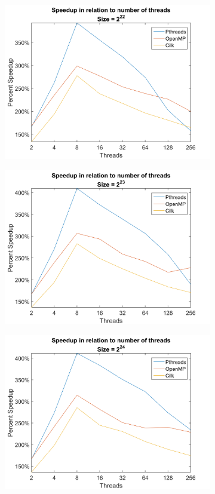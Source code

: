 \documentclass[11pt,a4paper,titlepage]{article}
\begin{document}
\begin{figure}[h!]
\begin{subfigure}[b]{0.45\textwidth}
				\includegraphics[width=\textwidth]{figures/figure-3.7.png}
				\caption{}
			\end{subfigure}
			\begin{subfigure}[b]{0.45\textwidth}
				\includegraphics[width=\textwidth]{figures/figure-3.8.png}
				\caption{}
			\end{subfigure}
			\begin{subfigure}[b]{0.45\textwidth}
				\includegraphics[width=\textwidth]{figures/figure-3.9.png}

\end{subfigure}
\end{figure}
\end{document}
